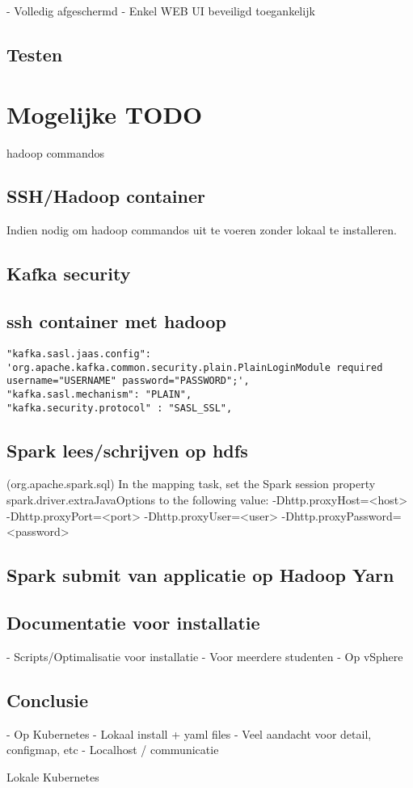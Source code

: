 - Volledig afgeschermd
- Enkel WEB UI beveiligd toegankelijk

\subsection{Testen}
\section{Mogelijke TODO}
hadoop commandos

\subsection{SSH/Hadoop container}

Indien nodig om hadoop commandos uit te voeren zonder lokaal te installeren.



\subsection{Kafka security}

\subsection{ssh container met hadoop}
\begin{lstlisting}
"kafka.sasl.jaas.config": 'org.apache.kafka.common.security.plain.PlainLoginModule required username="USERNAME" password="PASSWORD";',
"kafka.sasl.mechanism": "PLAIN",
"kafka.security.protocol" : "SASL_SSL",
\end{lstlisting}
\subsection{Spark lees/schrijven op hdfs}
 (org.apache.spark.sql)
In the mapping task, set the Spark session property spark.driver.extraJavaOptions to the following value: -Dhttp.proxyHost=<host> -Dhttp.proxyPort=<port> -Dhttp.proxyUser=<user> -Dhttp.proxyPassword=<password>

\subsection{Spark submit van applicatie op Hadoop Yarn}

\subsection{Documentatie voor installatie}

- Scripts/Optimalisatie voor installatie
- Voor meerdere studenten
- Op vSphere

\subsection{Conclusie}

- Op Kubernetes
- Lokaal install + yaml files
- Veel aandacht voor detail, configmap, etc
- Localhost / communicatie

Lokale Kubernetes